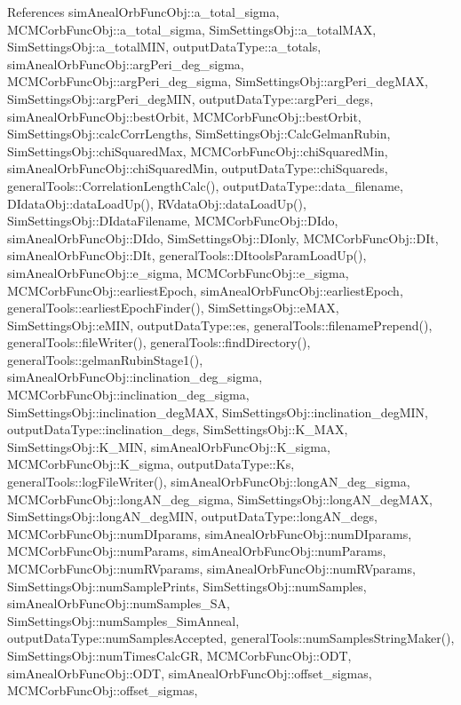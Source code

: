 References sim\-Aneal\-Orb\-Func\-Obj\-::a\-\_\-total\-\_\-sigma, M\-C\-M\-Corb\-Func\-Obj\-::a\-\_\-total\-\_\-sigma, Sim\-Settings\-Obj\-::a\-\_\-total\-M\-A\-X, Sim\-Settings\-Obj\-::a\-\_\-total\-M\-I\-N, output\-Data\-Type\-::a\-\_\-totals, sim\-Aneal\-Orb\-Func\-Obj\-::arg\-Peri\-\_\-deg\-\_\-sigma, M\-C\-M\-Corb\-Func\-Obj\-::arg\-Peri\-\_\-deg\-\_\-sigma, Sim\-Settings\-Obj\-::arg\-Peri\-\_\-deg\-M\-A\-X, Sim\-Settings\-Obj\-::arg\-Peri\-\_\-deg\-M\-I\-N, output\-Data\-Type\-::arg\-Peri\-\_\-degs, sim\-Aneal\-Orb\-Func\-Obj\-::best\-Orbit, M\-C\-M\-Corb\-Func\-Obj\-::best\-Orbit, Sim\-Settings\-Obj\-::calc\-Corr\-Lengths, Sim\-Settings\-Obj\-::\-Calc\-Gelman\-Rubin, Sim\-Settings\-Obj\-::chi\-Squared\-Max, M\-C\-M\-Corb\-Func\-Obj\-::chi\-Squared\-Min, sim\-Aneal\-Orb\-Func\-Obj\-::chi\-Squared\-Min, output\-Data\-Type\-::chi\-Squareds, general\-Tools\-::\-Correlation\-Length\-Calc(), output\-Data\-Type\-::data\-\_\-filename, D\-Idata\-Obj\-::data\-Load\-Up(), R\-Vdata\-Obj\-::data\-Load\-Up(), Sim\-Settings\-Obj\-::\-D\-Idata\-Filename, M\-C\-M\-Corb\-Func\-Obj\-::\-D\-Ido, sim\-Aneal\-Orb\-Func\-Obj\-::\-D\-Ido, Sim\-Settings\-Obj\-::\-D\-Ionly, M\-C\-M\-Corb\-Func\-Obj\-::\-D\-It, sim\-Aneal\-Orb\-Func\-Obj\-::\-D\-It, general\-Tools\-::\-D\-Itools\-Param\-Load\-Up(), sim\-Aneal\-Orb\-Func\-Obj\-::e\-\_\-sigma, M\-C\-M\-Corb\-Func\-Obj\-::e\-\_\-sigma, M\-C\-M\-Corb\-Func\-Obj\-::earliest\-Epoch, sim\-Aneal\-Orb\-Func\-Obj\-::earliest\-Epoch, general\-Tools\-::earliest\-Epoch\-Finder(), Sim\-Settings\-Obj\-::e\-M\-A\-X, Sim\-Settings\-Obj\-::e\-M\-I\-N, output\-Data\-Type\-::es, general\-Tools\-::filename\-Prepend(), general\-Tools\-::file\-Writer(), general\-Tools\-::find\-Directory(), general\-Tools\-::gelman\-Rubin\-Stage1(), sim\-Aneal\-Orb\-Func\-Obj\-::inclination\-\_\-deg\-\_\-sigma, M\-C\-M\-Corb\-Func\-Obj\-::inclination\-\_\-deg\-\_\-sigma, Sim\-Settings\-Obj\-::inclination\-\_\-deg\-M\-A\-X, Sim\-Settings\-Obj\-::inclination\-\_\-deg\-M\-I\-N, output\-Data\-Type\-::inclination\-\_\-degs, Sim\-Settings\-Obj\-::\-K\-\_\-\-M\-A\-X, Sim\-Settings\-Obj\-::\-K\-\_\-\-M\-I\-N, sim\-Aneal\-Orb\-Func\-Obj\-::\-K\-\_\-sigma, M\-C\-M\-Corb\-Func\-Obj\-::\-K\-\_\-sigma, output\-Data\-Type\-::\-Ks, general\-Tools\-::log\-File\-Writer(), sim\-Aneal\-Orb\-Func\-Obj\-::long\-A\-N\-\_\-deg\-\_\-sigma, M\-C\-M\-Corb\-Func\-Obj\-::long\-A\-N\-\_\-deg\-\_\-sigma, Sim\-Settings\-Obj\-::long\-A\-N\-\_\-deg\-M\-A\-X, Sim\-Settings\-Obj\-::long\-A\-N\-\_\-deg\-M\-I\-N, output\-Data\-Type\-::long\-A\-N\-\_\-degs, M\-C\-M\-Corb\-Func\-Obj\-::num\-D\-Iparams, sim\-Aneal\-Orb\-Func\-Obj\-::num\-D\-Iparams, M\-C\-M\-Corb\-Func\-Obj\-::num\-Params, sim\-Aneal\-Orb\-Func\-Obj\-::num\-Params, M\-C\-M\-Corb\-Func\-Obj\-::num\-R\-Vparams, sim\-Aneal\-Orb\-Func\-Obj\-::num\-R\-Vparams, Sim\-Settings\-Obj\-::num\-Sample\-Prints, Sim\-Settings\-Obj\-::num\-Samples, sim\-Aneal\-Orb\-Func\-Obj\-::num\-Samples\-\_\-\-S\-A, Sim\-Settings\-Obj\-::num\-Samples\-\_\-\-Sim\-Anneal, output\-Data\-Type\-::num\-Samples\-Accepted, general\-Tools\-::num\-Samples\-String\-Maker(), Sim\-Settings\-Obj\-::num\-Times\-Calc\-G\-R, M\-C\-M\-Corb\-Func\-Obj\-::\-O\-D\-T, sim\-Aneal\-Orb\-Func\-Obj\-::\-O\-D\-T, sim\-Aneal\-Orb\-Func\-Obj\-::offset\-\_\-sigmas, M\-C\-M\-Corb\-Func\-Obj\-::offset\-\_\-sigmas, 